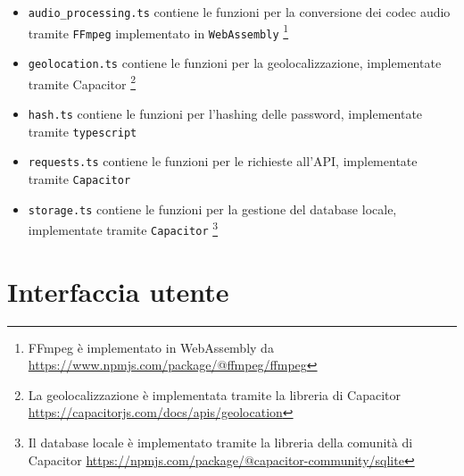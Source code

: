\documentclass{article}
\begin{document}

\begin{itemize}
    \item \texttt{audio\_processing.ts} contiene le funzioni per la conversione dei codec audio tramite \texttt{FFmpeg} implementato in \texttt{WebAssembly} \footnote{FFmpeg è implementato in WebAssembly da \url{https://www.npmjs.com/package/@ffmpeg/ffmpeg}}
    \item \texttt{geolocation.ts} contiene le funzioni per la geolocalizzazione, implementate tramite Capacitor \footnote{La geolocalizzazione è implementata tramite la libreria di Capacitor \url{https://capacitorjs.com/docs/apis/geolocation}}
    \item \texttt{hash.ts} contiene le funzioni per l'hashing delle password, implementate tramite \texttt{typescript}
    \item \texttt{requests.ts} contiene le funzioni per le richieste all'API, implementate tramite \texttt{Capacitor}
    \item \texttt{storage.ts} contiene le funzioni per la gestione del database locale, implementate tramite \texttt{Capacitor} \footnote{Il database locale è implementato tramite la libreria della comunità di Capacitor \url{https://npmjs.com/package/@capacitor-community/sqlite}}
\end{itemize}

\section{Interfaccia utente}

\end{document}
